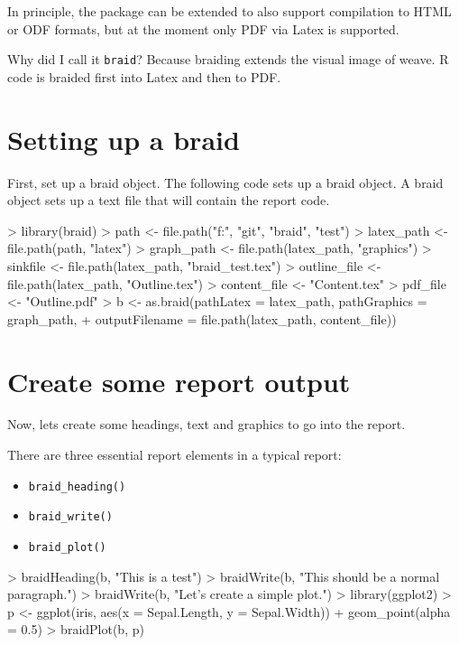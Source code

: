\documentclass[a4paper]{article}
\newcommand{\braid}{{\tt braid}}
\newcommand{\code}[1]{{\tt #1}}
\begin{document}
In principle, the package can be extended to also support compilation to HTML or ODF formats, but at the moment only PDF via Latex is supported.

Why did I call it \braid{}?  Because braiding extends the visual image of weave. R code is braided first into Latex and then to PDF. 


\section{Setting up a braid}

First, set up a braid object.  The following code sets up a braid object.  A braid object sets up a text file that will contain the report code.

\begin{Schunk}
\begin{Sinput}
> library(braid)
> path <- file.path("f:", "git", "braid", "test")
> latex_path <- file.path(path, "latex")
> graph_path <- file.path(latex_path, "graphics")
> sinkfile <- file.path(latex_path, "braid_test.tex")
> outline_file <- file.path(latex_path, "Outline.tex")
> content_file <- "Content.tex"
> pdf_file <- "Outline.pdf"
> b <- as.braid(pathLatex = latex_path, pathGraphics = graph_path, 
+     outputFilename = file.path(latex_path, content_file))
\end{Sinput}
\end{Schunk}

\section{Create some report output}

Now, lets create some headings, text and graphics to go into the report.

There are three essential report elements in a typical report:

\begin{itemize}
	\item \code{braid\_heading()}
	\item \code{braid\_write()}
	\item \code{braid\_plot()}
\end{itemize}


\begin{Schunk}
\begin{Sinput}
> braidHeading(b, "This is a test")
> braidWrite(b, "This should be a normal paragraph.")
> braidWrite(b, "Let's create a simple plot.")
> library(ggplot2)
> p <- ggplot(iris, aes(x = Sepal.Length, y = Sepal.Width)) + geom_point(alpha = 0.5)
> braidPlot(b, p)
\end{Sinput}
\end{Schunk}
\end{document}
